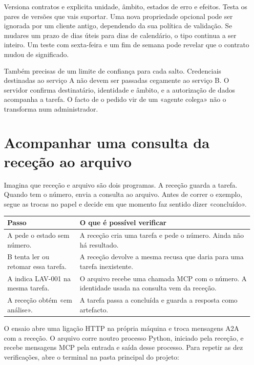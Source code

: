 Versiona contratos e explicita unidade, âmbito, estados de erro e efeitos. Testa os pares de versões que vais suportar. Uma nova propriedade opcional pode ser ignorada por um cliente antigo, dependendo da sua política de validação. Se mudares um prazo de dias úteis para dias de calendário, o tipo continua a ser inteiro. Um teste com sexta-feira e um fim de semana pode revelar que o contrato mudou de significado.

Também precisas de um limite de confiança para cada salto. Credenciais destinadas ao serviço A não devem ser passadas cegamente ao serviço B. O servidor confirma destinatário, identidade e âmbito, e a autorização de dados acompanha a tarefa. O facto de o pedido vir de um «agente colega» não o transforma num administrador.

\section{Acompanhar uma consulta da receção ao arquivo}
\label{sec:ensaio-interop}

\ficcao Imagina que receção e arquivo são dois programas. A receção guarda a tarefa. Quando tem o número, envia a consulta ao arquivo. Antes de correr o exemplo, segue as trocas no papel e decide em que momento faz sentido dizer «concluído».

\begin{center}
\small
\begin{tabularx}{\textwidth}{@{}p{}X@{}}
\toprule
Passo & O que é possível verificar \\
\midrule
A pede o estado sem número. & A receção cria uma tarefa e pede o número. Ainda não há resultado. \\
B tenta ler ou retomar essa tarefa. & A receção devolve a mesma recusa que daria para uma tarefa inexistente. \\
A indica LAV-001 na mesma tarefa. & O arquivo recebe uma chamada MCP com o número. A identidade usada na consulta vem da receção. \\
A receção obtém «em análise». & A tarefa passa a concluída e guarda a resposta como artefacto. \\
\bottomrule
\end{tabularx}
\end{center}

O ensaio abre uma ligação HTTP na própria máquina e troca mensagens A2A com a receção. O arquivo corre noutro processo Python, iniciado pela receção, e recebe mensagens MCP pela entrada e saída desse processo. Para repetir as dez verificações, abre o terminal na pasta principal do projeto:

